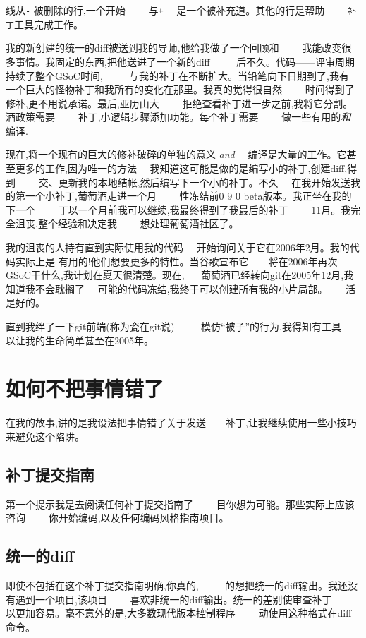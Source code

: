 线从\texttt{-} 被删除的行,一个开始　　
与\texttt{+} 　是一个被补充道。其他的行是帮助　　
\texttt{补丁}工具完成工作。

我的新创建的统一的diff被送到我的导师,他给我做了一个回顾和　　
我能改变很多事情。我固定的东西,把他送进了一个新的diff 　　
后不久。代码——评审周期持续了整个GSoC时间, 　　
与我的补丁在不断扩大。当铅笔向下日期到了,我有　　
一个巨大的怪物补丁和我所有的变化在那里。我真的觉得很自然　　
时间得到了修补,更不用说承诺。最后,亚历山大　　
拒绝查看补丁进一步之前,我将它分割。酒政策需要　　
补丁,小逻辑步骤添加功能。每个补丁需要　　
做一些有用的\emph{和} 编译.

现在,将一个现有的巨大的修补破碎的单独的意义
\emph{and} 　编译是大量的工作。它甚至更多的工作,因为唯一的方法　
我知道这可能是做的是编写小的补丁,创建diff,得到　　
交、更新我的本地结帐,然后编写下一个小的补丁。不久　
在我开始发送我的第一个小补丁,葡萄酒走进一个月　　
性冻结前0 9 0 beta版本。我正坐在我的下一个　　
丁以一个月前我可以继续,我最终得到了我最后的补丁　　
11月。我完全沮丧,整个经验和决定我　　
想处理葡萄酒社区了。

我的沮丧的人持有直到实际使用我的代码　
开始询问关于它在2006年2月。我的代码实际上是
有用的!他们想要更多的特性。当谷歌宣布它　　将在2006年再次GSoC干什么,我计划在夏天很清楚。现在, 　
葡萄酒已经转向git在2005年12月,我知道我不会耽搁了　
可能的代码冻结,我终于可以创建所有我的小片局部。　　
活是好的。

直到我绊了一下git前端(称为瓷在git说) 　　
模仿“被子”的行为,我得知有工具　　
以让我的生命简单甚至在2005年。

\section*{如何不把事情错了}

在我的故事,讲的是我设法把事情错了关于发送　　补丁,让我继续使用一些小技巧来避免这个陷阱。

\subsection*{补丁提交指南}

第一个提示我是去阅读任何补丁提交指南了　　
目你想为可能。那些实际上应该咨询　　
你开始编码,以及任何编码风格指南项目。

\subsection*{统一的diff}

即使不包括在这个补丁提交指南明确,你真的, 　　
的想把统一的diff输出。我还没有遇到一个项目,该项目　　
喜欢非统一的diff输出。统一的差别使审查补丁　　
以更加容易。毫不意外的是,大多数现代版本控制程序　　
动使用这种格式在diff命令。


